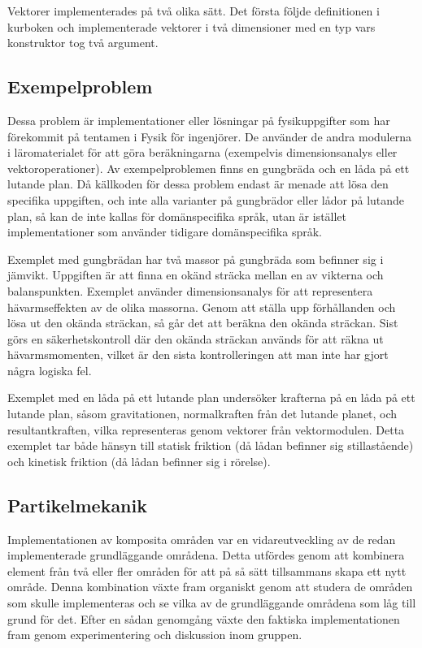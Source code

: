 Vektorer implementerades på två olika sätt. Det första följde definitionen i
kurboken och implementerade vektorer i två dimensioner med en typ vars
konstruktor tog två argument.

\subsection{Exempelproblem}

Dessa problem är implementationer eller lösningar på fysikuppgifter som har förekommit på tentamen i Fysik för ingenjörer. De använder de andra modulerna i läromaterialet för att göra beräkningarna (exempelvis dimensionsanalys eller vektoroperationer). Av exempelproblemen finns en gungbräda och en låda på ett lutande plan. Då källkoden för dessa problem endast är menade att lösa den specifika uppgiften, och inte alla varianter på gungbrädor eller lådor på lutande plan, så kan de inte kallas för domänspecifika språk, utan är istället implementationer som använder tidigare domänspecifika språk.

Exemplet med gungbrädan har två massor på gungbräda som befinner sig i jämvikt. Uppgiften är att finna en okänd sträcka mellan en av vikterna och balanspunkten. Exemplet använder dimensionsanalys för att representera hävarmseffekten av de olika massorna. Genom att ställa upp förhållanden och lösa ut den okända sträckan, så går det att beräkna den okända sträckan. Sist görs en säkerhetskontroll där den okända sträckan används för att räkna ut hävarmsmomenten, vilket är den sista kontrolleringen att man inte har gjort några logiska fel.

Exemplet med en låda på ett lutande plan undersöker krafterna på en låda på ett lutande plan, såsom gravitationen, normalkraften från det lutande planet, och resultantkraften, vilka representeras genom vektorer från vektormodulen. Detta exemplet tar både hänsyn till statisk friktion (då lådan befinner sig stillastående) och kinetisk friktion (då lådan befinner sig i rörelse).

\subsection{Partikelmekanik}

Implementationen av komposita områden var en vidareutveckling av de redan
implementerade grundläggande områdena. Detta utfördes genom att kombinera
element från två eller fler områden för att på så sätt tillsammans skapa ett
nytt område. Denna kombination växte fram organiskt genom att studera de områden
som skulle implementeras och se vilka av de grundläggande områdena som
låg till grund för det. Efter en sådan genomgång växte den faktiska
implementationen fram genom experimentering och diskussion inom gruppen.

